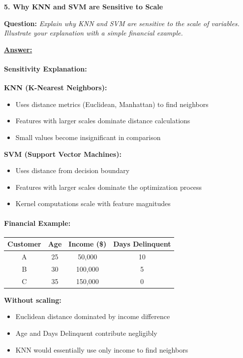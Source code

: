 \documentclass[11pt,a4paper]{article}
\newcommand{\questiontitle}[2]{%
    \vspace{0.4cm}%
    \noindent\textbf{\large\color{headerblue}#1. #2}\par\vspace{0.15cm}%
}
\newcommand{\qprompt}[1]{%
    \noindent\textbf{Question:} \textit{#1}\par\vspace{0.2cm}%
}
\newcommand{\answer}{\noindent\textbf{\underline{Answer:}}\par\vspace{0.15cm}}
\begin{document}
\questiontitle{5}{Why KNN and SVM are Sensitive to Scale}
\qprompt{Explain why KNN and SVM are sensitive to the scale of variables. Illustrate your explanation with a simple financial example.}
\answer
\paragraph{Sensitivity Explanation:}
\noindent\textbf{KNN (K-Nearest Neighbors):}
\begin{itemize}
    \item Uses distance metrics (Euclidean, Manhattan) to find neighbors
    \item Features with larger scales dominate distance calculations
    \item Small values become insignificant in comparison
\end{itemize}

\noindent\textbf{SVM (Support Vector Machines):}
\begin{itemize}
    \item Uses distance from decision boundary
    \item Features with larger scales dominate the optimization process
    \item Kernel computations scale with feature magnitudes
\end{itemize}

\paragraph{Financial Example:}
\begin{center}
\begin{tabular}{cccc}
\toprule
\textbf{Customer} & \textbf{Age} & \textbf{Income (\$)} & \textbf{Days Delinquent} \\
\midrule
A & 25 & 50,000 & 10 \\
B & 30 & 100,000 & 5 \\
C & 35 & 150,000 & 0 \\
\bottomrule
\end{tabular}
\end{center}

\noindent\textbf{Without scaling:}
\begin{itemize}
    \item Euclidean distance dominated by income difference
    \item Age and Days Delinquent contribute negligibly
    \item KNN would essentially use only income to find neighbors
\end{itemize}
\end{document}
